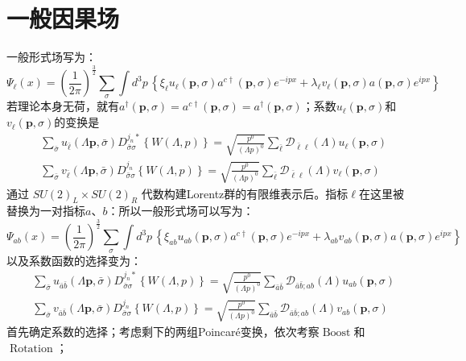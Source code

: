\newpage
\section{一般因果场}\label{sec:massive_fields}
一般形式场写为：\begin{equation*}
    \Psi_\ell(x) =(\frac{1}{2\pi})^\frac{3}{2}\sum_{\sigma}\int d^3p \, \left\{\xi_\ell u_\ell(\boldsymbol{p},\sigma)a^{c\dagger}(\boldsymbol{p},\sigma) e^{-ipx} + \lambda_\ell v_\ell(\boldsymbol{p},\sigma) a(\boldsymbol{p},\sigma)e^{ipx} \right\}
\end{equation*}
若理论本身无荷，就有$a^{\dagger}(\boldsymbol{p},\sigma)=a^{c\dagger}(\boldsymbol{p},\sigma)=a^{\dagger}(\boldsymbol{p},\sigma)$；系数$u_\ell(\boldsymbol{p},\sigma)$和$v_\ell(\boldsymbol{p},\sigma)$的变换是
\begin{subequations}
    \begin{align}
        &\sum_{\bar{\sigma}}u_{\bar{\ell}}(\Lambda \boldsymbol{p},\bar{\sigma})D_{\bar{\sigma}\sigma }^{j_n*}\left\{W(\Lambda,p)\right\}=\sqrt{\frac{p^0}{(\Lambda p)^0}}\sum_{\bar{\ell}}\mathscr{D}_{\bar{\ell}\ell}(\Lambda)u_{\ell}(\boldsymbol{p},\sigma)
        \\
        &\sum_{\bar{\sigma}}v_{\bar{\ell}}(\Lambda \boldsymbol{p},\bar{\sigma})D_{\bar{\sigma}\sigma }^{j_n}\left\{W(\Lambda,p)\right\}=\sqrt{\frac{p^0}{(\Lambda p)^0}}\sum_{\bar{\ell}}\mathscr{D}_{\bar{\ell}\ell}(\Lambda)v_{\ell}(\boldsymbol{p},\sigma)
    \end{align}
\end{subequations}
\topictitle{***}
通过 $SU(2)_L \times SU(2)_R$ 代数构建Lorentz群的有限维表示后。指标$\ell$在这里被替换为一对指标$a$、$b$：所以一般形式场可以写为：\begin{equation}
    \Psi_{ab}(x) =(\frac{1}{2\pi})^\frac{3}{2}\sum_{\sigma}\int d^3p \, \left\{\xi_{ab} u_{ab}(\boldsymbol{p},\sigma)a^{c\dagger}(\boldsymbol{p},\sigma) e^{-ipx} + \lambda_{ab} v_{ab}(\boldsymbol{p},\sigma) a(\boldsymbol{p},\sigma)e^{ipx} \right\}
\end{equation}
以及系数函数的选择变为：
\begin{subequations}
    \begin{align}
        &\sum_{\bar{\sigma}}u_{\bar{a}\bar{b}}(\Lambda \boldsymbol{p},\bar{\sigma})D_{\bar{\sigma}\sigma }^{j_n*}\left\{W(\Lambda,p)\right\}=\sqrt{\frac{p^0}{(\Lambda p)^0}}\sum_{\bar{a}\bar{b}}\mathscr{D}_{\bar{a}\bar{b};ab}(\Lambda)u_{ab}(\boldsymbol{p},\sigma)
        \\
        &\sum_{\bar{\sigma}}v_{\bar{a}\bar{b}}(\Lambda \boldsymbol{p},\bar{\sigma})D_{\bar{\sigma}\sigma }^{j_n}\left\{W(\Lambda,p)\right\}=\sqrt{\frac{p^0}{(\Lambda p)^0}}\sum_{\bar{a}\bar{b}}\mathscr{D}_{\bar{a}\bar{b};ab}(\Lambda)v_{ab}(\boldsymbol{p},\sigma)
    \end{align}
\end{subequations}
首先确定系数的选择；考虑剩下的两组Poincar\'e变换，依次考察$\operatorname{Boost}$和$\operatorname{Rotation}$；
